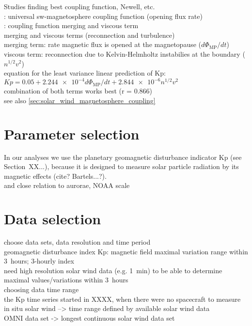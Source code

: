 Studies finding best coupling function, Newell, etc.\\

\citet{Newell2007}: universal sw-magnetosphere coupling function (opening flux rate)\\
\citet{Newell2008}: coupling function merging and viscous term\\
merging and viscous terms (reconnection and turbulence)\\
merging term: rate magnetic flux is opened at the magnetopause ($d\Phi_\text{MP}/dt$)\\
viscous term: reconnection due to Kelvin-Helmholtz instabilies at the boundary ($n^{1/2} v^2$)\\
equation for the least variance linear prediction of Kp: $Kp = 0.05 + \num{2.244e-4} d\Phi_\text{MP}/dt + \num{2.844e-6} n^{1/2} v^2$\\
combination of both terms works best (r = 0.866)\\

see also \autoref{sec:solar_wind_magnetosphere_coupling}\\


\section{Parameter selection}
In our analyses we use the planetary geomagnetic disturbance indicator Kp (see Section~XX...), because it is designed to measure solar particle radiation by its magnetic effects (cite? Bartels...?).\\
and close relation to aurorae, NOAA scale\\


\section{Data selection}
choose data sets, data resolution and time period\\

geomagnetic disturbance index Kp: magnetic field maximal variation range within 3~hours; 3-hourly index\\
need high resolution solar wind data (e.g. 1~min) to be able to determine maximal values/variations within 3~hours\\

choosing data time range\\
the Kp time series started in XXXX, when there were no spacecraft to measure in situ solar wind --> time range defined by available solar wind data\\
OMNI data set -> longest continuous solar wind data set\\


